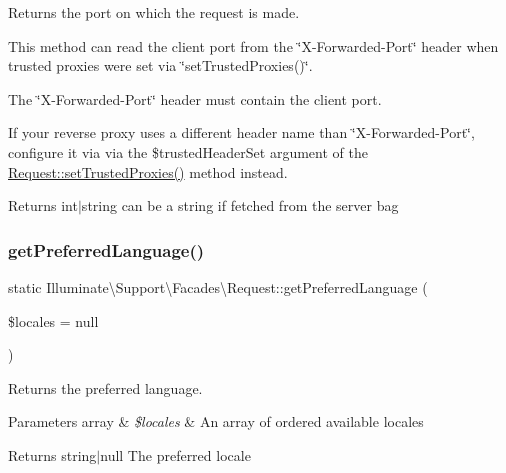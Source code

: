 Returns the port on which the request is made.

This method can read the client port from the \char`\"{}\+X-\/\+Forwarded-\/\+Port\char`\"{} header when trusted proxies were set via \char`\"{}set\+Trusted\+Proxies()\char`\"{}.

The \char`\"{}\+X-\/\+Forwarded-\/\+Port\char`\"{} header must contain the client port.

If your reverse proxy uses a different header name than \char`\"{}\+X-\/\+Forwarded-\/\+Port\char`\"{}, configure it via via the \$trusted\+Header\+Set argument of the \mbox{\hyperlink{class_illuminate_1_1_support_1_1_facades_1_1_request_a1686fbcf12f72ed06a19adf0633054fa}{Request\+::set\+Trusted\+Proxies()}} method instead.

\begin{DoxyReturn}{Returns}
int$\vert$string can be a string if fetched from the server bag 
\end{DoxyReturn}
\mbox{\label{class_illuminate_1_1_support_1_1_facades_1_1_request_aa8cf52deb0fe5bdb8f0639d5d000c53d}} 
\subsubsection{\texorpdfstring{get\+Preferred\+Language()}{getPreferredLanguage()}}
{\footnotesize\ttfamily static Illuminate\textbackslash{}\+Support\textbackslash{}\+Facades\textbackslash{}\+Request\+::get\+Preferred\+Language (\begin{DoxyParamCaption}\item[{}]{\$locales = {\ttfamily null} }\end{DoxyParamCaption})\hspace{0.3cm}{\ttfamily [static]}}

Returns the preferred language.


\begin{DoxyParams}[1]{Parameters}
array & {\em \$locales} & An array of ordered available locales \\
\hline
\end{DoxyParams}
\begin{DoxyReturn}{Returns}
string$\vert$null The preferred locale 
\end{DoxyReturn}
\mbox{\label{class_illuminate_1_1_support_1_1_facades_1_1_request_aec1fe0b0a5b7c90b9b3606f967083d82}} 
